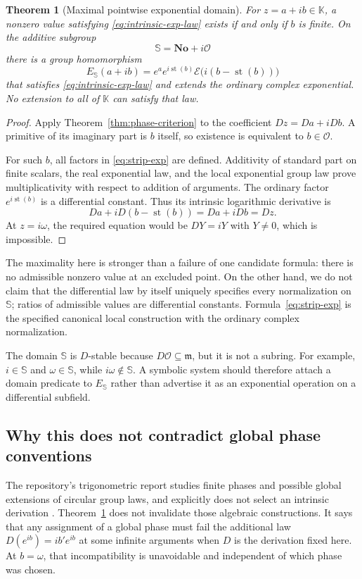\documentclass[11pt,a4paper]{article}
\numberwithin{equation}{section}
\newtheorem{theorem}{Theorem}[section]
\theoremstyle{definition}
\theoremstyle{remark}
\newcommand{\No}{\mathbf{No}}
\newcommand{\K}{\mathbb K}
\newcommand{\OO}{\mathcal O}
\newcommand{\mm}{\mathfrak m}
\newcommand{\EE}{\mathcal E}
\newcommand{\st}{\operatorname{st}}
\newcommand{\PS}{\mathbb S}
\begin{document}
\begin{theorem}[Maximal pointwise exponential domain]\label{thm:strip}
For $z=a+ib\in\K$, a nonzero value satisfying
\eqref{eq:intrinsic-exp-law} exists if and only if $b$ is finite.
On the additive subgroup
\[
 \PS=\No+i\OO
\]
there is a group homomorphism
\begin{equation}\label{eq:strip-exp}
 E_{\PS}(a+ib)=e^a e^{i\st(b)}
              \EE\bigl(i(b-\st(b))\bigr)
\end{equation}
that satisfies \eqref{eq:intrinsic-exp-law} and extends the ordinary
complex exponential. No extension to all of $\K$ can satisfy that law.
\end{theorem}
\begin{proof}
Apply Theorem~\ref{thm:phase-criterion} to the coefficient
$Dz=Da+iDb$. A primitive of its imaginary part is $b$ itself, so existence
is equivalent to $b\in\OO$.

For such $b$, all factors in \eqref{eq:strip-exp} are defined. Additivity of
standard part on finite scalars, the real exponential law, and the local
exponential group law prove multiplicativity with respect to addition of
arguments. The ordinary factor $e^{i\st(b)}$ is a differential constant.
Thus its intrinsic logarithmic derivative is
\[
 Da+iD(b-\st(b))=Da+iDb=Dz.
\]
At $z=i\omega$, the required equation would be $DY=iY$ with $Y\ne0$,
which is impossible.
\end{proof}

The maximality here is stronger than a failure of one candidate formula:
there is no admissible nonzero value at an excluded point. On the other
hand, we do not claim that the differential law by itself uniquely specifies
every normalization on $\PS$; ratios of admissible values are differential
constants. Formula~\eqref{eq:strip-exp} is the specified canonical local
construction with the ordinary complex normalization.

The domain $\PS$ is $D$-stable because $D\OO\subseteq\mm$, but it is not
a subring. For example, $i\in\PS$ and $\omega\in\PS$, while
$i\omega\notin\PS$. A symbolic system should therefore attach a domain
predicate to $E_{\PS}$ rather than advertise it as an exponential operation
on a differential subfield.

\subsection{Why this does not contradict global phase conventions}

The repository's trigonometric report studies finite phases and possible
global extensions of circular group laws, and explicitly does not select
an intrinsic derivation \cite{RepoTrig}. Theorem~\ref{thm:strip} does not
invalidate those algebraic constructions. It says that any assignment of a
global phase must fail the additional law $D(e^{ib})=ib'e^{ib}$ at some
infinite arguments when $D$ is the derivation fixed here. At $b=\omega$,
that incompatibility is unavoidable and independent of which phase was
chosen.
\end{document}
